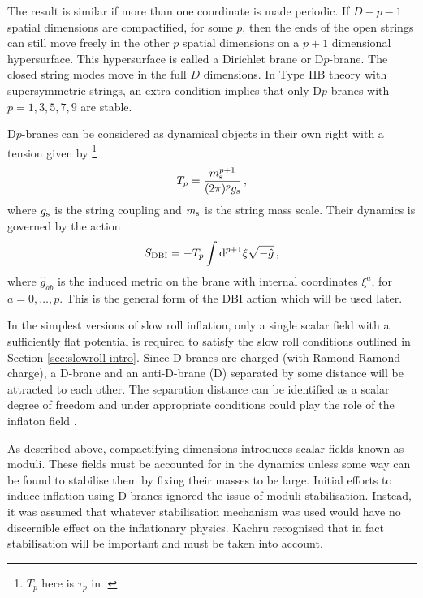 The result is similar if more than
one coordinate is made periodic.
If $D-p-1$ spatial dimensions are compactified, for some $p$, then the ends of
the open
strings can still move freely in the other $p$ spatial dimensions on a $p+1$
dimensional hypersurface. This hypersurface is called a Dirichlet brane or
D$p$-brane. The closed string modes move in the full $D$ dimensions.
% 
In Type IIB theory with supersymmetric strings, an extra condition implies that
only D$p$-branes with $p=1,3,5,7,9$ are stable\footnotemark.
% 

D$p$-branes can be considered as dynamical objects in their own right with a
tension given by \cite{Johnson2000}\footnote{$T_p$ here is $\tau_p$ in
.}
% 
\begin{equation}
\label{eq:branetensiondefn-dbiintro}
 T_p = \frac{m_\mathrm{s}^{p+1}}{(2\pi)^p g_\mathrm{s}}\,,
\end{equation}
% 
where $g_\mathrm{s}$ is the string coupling and $m_\mathrm{s}$ is the string mass scale.
Their dynamics is governed by the action 
% 
\begin{equation}
\label{eq:gendbiaction-dbiintro}
 S_\mathrm{DBI} = -T_p \int \mathrm{d}^{p+1}\xi \sqrt{-\hat{g}}\,,
\end{equation}
where $\hat{g}_{ab}$ is the induced metric on the brane with internal
coordinates $\xi^a$, for $a=0,\ldots,p$. This is the general form of the DBI
action which will be used later.


In the simplest versions of slow roll inflation, only a single scalar field
with a
sufficiently flat potential is required to satisfy the slow roll conditions outlined
in
Section \ref{sec:slowroll-intro}. Since D-branes are charged (with Ramond-Ramond
charge), a D-brane and an anti-D-brane
($\overline{\mathrm{D}}$) separated by some distance will be attracted to each other.
The separation distance
can be identified as a scalar degree of freedom and under appropriate conditions
could play the role of the inflaton
field \cite{brane1,brane2,brane3,brane7,Brodie:2003qv,brane9}. 

As described above, compactifying dimensions
introduces scalar fields known as moduli. These fields must be
accounted for in the dynamics unless some way can be found to stabilise them by
fixing their masses to be large.
Initial efforts to induce inflation using D-branes ignored the issue of moduli
stabilisation. Instead, it was
assumed that whatever stabilisation mechanism was used would have no discernible
effect on the inflationary physics. Kachru \etal \cite{brane4} recognised that
in fact stabilisation will be important and must be taken into account.

